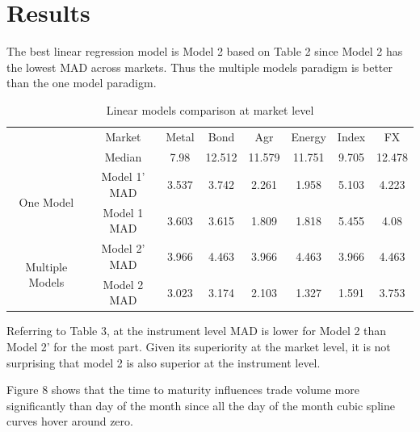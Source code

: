 \documentclass[12pt]{article}
\begin{document}
\section*{Results} 

The best linear regression model is Model 2 based on Table 2 since Model 2 has the lowest MAD across markets. Thus the multiple models paradigm is better than the one model paradigm. 

\begin{table}[H]
	\centering
	\caption{Linear models comparison at market level}
	\label{Table 2}
	\begin{tabular}{|c|c|c|c|c|c|c|c|}
		\hline
		\multirow{2}{*}{}                & Market      & Metal & Bond   & Agr    & Energy & Index & FX     \\ \cline{2-8} 
		& Median       & 7.98  & 12.512 & 11.579 & 11.751 & 9.705 & 12.478 \\ \hline
		\multirow{2}{*}{One Model}       & Model 1' MAD & 3.537 & 3.742  & 2.261  & 1.958  & 5.103 & 4.223  \\ \cline{2-8} 
		& Model 1 MAD  & 3.603 & 3.615  & 1.809  & 1.818  & 5.455 & 4.08   \\ \hline
		\multirow{2}{*}{Multiple Models} & Model 2' MAD & 3.966 & 4.463  & 3.966  & 4.463  & 3.966 & 4.463  \\ \cline{2-8} 
		& Model 2 MAD  & 3.023 & 3.174  & 2.103  & 1.327  & 1.591 & 3.753  \\ \hline
	\end{tabular}
\end{table}

Referring to Table 3, at the instrument level MAD is lower for Model 2 than Model 2' for the most part. Given its superiority at the market level, it is not surprising that model 2 is also superior at the instrument level. 

Figure 8 shows that the time to maturity influences trade volume more significantly than day of the month since all the day of the month cubic spline curves hover around zero.
\end{document}
